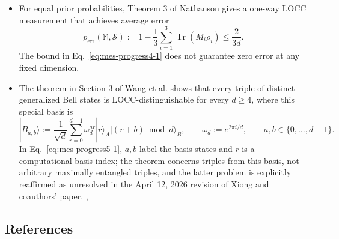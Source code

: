 \begin{itemize}
  \item For equal prior probabilities, Theorem 3 of Nathanson gives a one-way LOCC measurement that achieves average error
  \begin{equation}
p_{\mathrm{err}}(\mathbb M,\mathcal S)
  :=1-\frac13\sum_{i=1}^3\operatorname{Tr}(M_i\rho_i)
  \leq\frac{2}{3d}.
\label{eq:mes-progress4-1}
\end{equation}
  The bound in Eq.~\eqref{eq:mes-progress4-1} does not guarantee zero error at any fixed dimension. 

  \item The theorem in Section 3 of Wang et al. shows that every triple of distinct generalized Bell states is LOCC-distinguishable for every $d\geq4$, where this special basis is
  \begin{equation}
|B_{a,b}\rangle
  :=\frac1{\sqrt d}\sum_{r=0}^{d-1}\omega_d^{ar}
  |r\rangle_A|(r+b)\bmod d\rangle_B,
  \qquad
  \omega_d:=e^{2\pi i/d},
  \qquad
  a,b\in\{0,\ldots,d-1\}.
\label{eq:mes-progress5-1}
\end{equation}
  In Eq.~\eqref{eq:mes-progress5-1}, $a,b$ label the basis states and $r$ is a computational-basis index; the theorem concerns triples from this basis, not arbitrary maximally entangled triples, and the latter problem is explicitly reaffirmed as unresolved in the April 12, 2026 revision of Xiong and coauthors' paper. , 
\end{itemize}

\subsection*{References}

